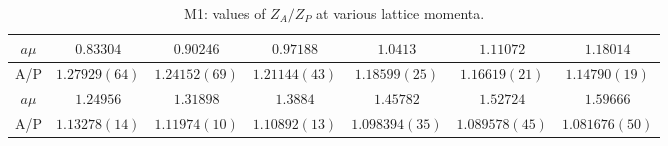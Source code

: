 \begin{table}[h!]
\begin{center}
\caption{M1: values of $Z_A/Z_P$ at various lattice momenta.}
\begin{tabular}{c|c c c c c c}
\hline
\hline
$a\mu$ & $0.83304$ & $0.90246$ & $0.97188$ & $1.0413$ & $1.11072$ & $1.18014$ \\
\hline
A/P & $1.27929(64)$ & $1.24152(69)$ & $1.21144(43)$ & $1.18599(25)$ & $1.16619(21)$ & $1.14790(19)$ \\
\hline
$a\mu$ & $1.24956$ & $1.31898$ & $1.3884$ & $1.45782$ & $1.52724$ & $1.59666$ \\
\hline
A/P & $1.13278(14)$ & $1.11974(10)$ & $1.10892(13)$ & $1.098394(35)$ & $1.089578(45)$ & $1.081676(50)$ \\
\hline
\hline
\end{tabular}
\end{center}
\end{table}